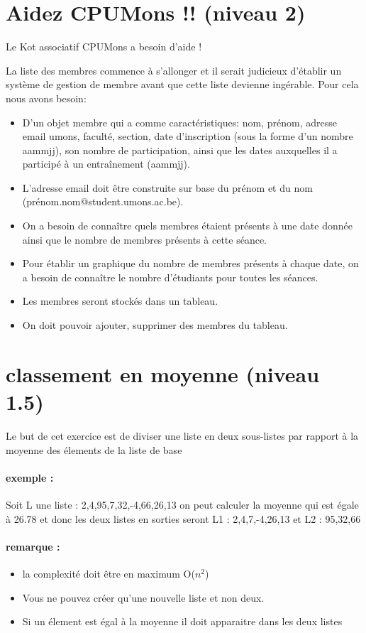 \documentclass[a4paper]{article}
\begin{document}
\section{Aidez CPUMons !! (niveau 2)}
Le Kot associatif CPUMons a besoin d'aide ! 

La liste des membres commence à s'allonger et il serait judicieux d'établir un système de gestion de membre avant que cette liste devienne ingérable.
Pour cela nous avons besoin:
\begin{itemize}
\item D'un objet membre qui a comme caractéristiques: nom, prénom, adresse email umons, faculté, section, date d'inscription (sous la forme d'un nombre aammjj), son nombre de participation, ainsi que les dates auxquelles il a participé à un entraînement (aammjj).
\item L'adresse email doit être construite sur base du prénom et du nom (prénom.nom@student.umons.ac.be).
\item On a besoin de connaître quels membres étaient présents à une date donnée ainsi que le nombre de membres présents à cette séance.
\item Pour établir un graphique du nombre de membres présents à chaque date, on a besoin de connaître le nombre d'étudiants pour toutes les séances.
\item Les membres seront stockés dans un tableau.
\item On doit pouvoir ajouter, supprimer des membres du tableau.
\end{itemize}

\section{classement en moyenne (niveau 1.5)}
Le but de cet exercice est de diviser une liste en deux sous-listes par rapport à la moyenne des élements de la liste de base
\paragraph{exemple : }
Soit L une liste : {2,4,95,7,32,-4,66,26,13} on peut calculer la moyenne qui est égale à 26.78 et donc les deux listes en sorties seront L1 : {2,4,7,-4,26,13} et L2 : {95,32,66}
\paragraph{remarque : }
\begin{itemize}
\item la complexité doit être en maximum O($n^2$)
\item Vous ne pouvez créer qu'une nouvelle liste et non deux.
\item Si un élement est égal à la moyenne il doit apparaitre dans les deux listes
\end{itemize}
\end{document}
